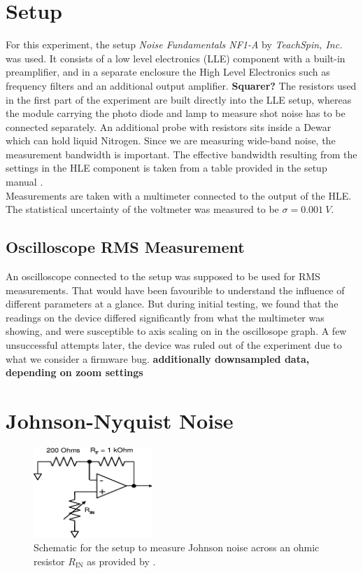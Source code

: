 \documentclass[
    parskip=half, 
    twoside=false,
    twocolumn=true,
    fontsize=11pt,
]{scrarticle}
\begin{document}
\section{Setup}
For this experiment, the setup \textit{Noise Fundamentals NF1-A} by \textit{TeachSpin, Inc.} was used. It consists of a low level electronics (LLE) component with a built-in preamplifier, and in a separate enclosure the High Level Electronics such as frequency filters and an additional output amplifier. 
\textbf{Squarer?}
The resistors used in the first part of the experiment are built directly into the LLE setup, whereas the module carrying the photo diode and lamp to measure shot noise has to be connected separately. An additional probe with resistors sits inside a Dewar which can hold liquid Nitrogen. Since we are measuring wide-band noise, the measurement bandwidth is important. The effective bandwidth resulting from the settings in the HLE component is taken from a table provided in the setup manual \autocite{instructions}.\\
Measurements are taken with a multimeter connected to the output of the HLE. The statistical uncertainty of the voltmeter was measured to be $\sigma = \SI{0.001}{V}$.

\subsection*{Oscilloscope RMS Measurement}
An oscilloscope connected to the setup was supposed to be used for RMS measurements. That would have been favourible to understand the influence of different parameters at a glance. But during initial testing, we found that the readings on the device differed significantly from what the multimeter was showing, and were susceptible to axis scaling on in the oscillosope graph. A few unsuccessful attempts later, the device was ruled out of the experiment due to what we consider a firmware bug.
\textbf{additionally downsampled data, depending on zoom settings}

\section{Johnson-Nyquist Noise}


\begin{figure}
    \centering
    \includegraphics[width=0.4\textwidth]{figures/measure_R_setup_part1.pdf}
    \caption{
        Schematic for the setup to measure Johnson noise across an ohmic resistor $R_\text{IN}$ as provided by \autocite{instructions}.
    }
    \label{fig:johnson setup R}
\end{figure}
\end{document}
